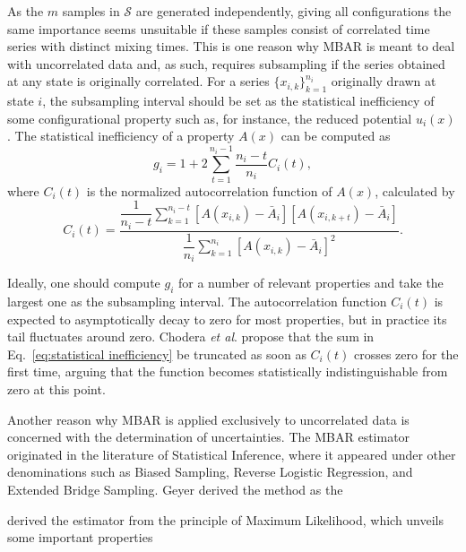 \documentclass[aip,jcp,preprint,amsmath,amssymb]{revtex4-1}
\begin{document}
As the $m$ samples in $\mathcal S$ are generated independently, giving all configurations the same importance seems unsuitable if these samples consist of correlated time series with distinct mixing times. This is one reason why MBAR is meant to deal with uncorrelated data and, as such, requires subsampling if the series obtained at any state is originally correlated.\cite{Shirts_2008} For a series $\{x_{i,k}\}_{k=1}^{n_i}$ originally drawn at state $i$, the subsampling interval should be set as the statistical inefficiency of some configurational property such as, for instance, the reduced potential $u_i(x)$. The statistical inefficiency of a property $A(x)$ can be computed as\cite{Chodera_2007}
\begin{equation}
\label{eq:statistical inefficiency}
g_i = 1 + 2 \sum\limits_{t=1}^{n_i-1} \frac{n_i - t}{n_i} C_i(t),
\end{equation}
where $C_i(t)$ is the normalized autocorrelation function of $A(x)$, calculated by
\begin{equation*}
C_i(t) = \frac{\dfrac{1}{n_i - t} \sum\limits_{k=1}^{n_i-t} [A(x_{i,k}) - \bar A_i][A(x_{i,k+t}) - \bar A_i]}{\dfrac{1}{n_i} \sum\limits_{k=1}^{n_i} [A(x_{i,k}) - \bar A_i]^2}.
\end{equation*}

Ideally, one should compute $g_i$ for a number of relevant properties and take the largest one as the subsampling interval.\cite{Shirts_2008} The autocorrelation function $C_i(t)$ is expected to asymptotically decay to zero for most properties, but in practice its tail fluctuates around zero. Chodera \textit{et al}.\cite{Chodera_2007} propose that the sum in Eq.~\eqref{eq:statistical inefficiency} be truncated as soon as $C_i(t)$ crosses zero for the first time, arguing that the function becomes statistically indistinguishable from zero at this point.

Another reason why MBAR is applied exclusively to uncorrelated data is concerned with the determination of uncertainties. The MBAR estimator originated in the literature of Statistical Inference, where it appeared under other denominations such as Biased Sampling,\cite{Vardi_1985, *Gill_1988} Reverse Logistic Regression,\cite{Geyer_1994} and Extended Bridge Sampling.\cite{Meng_1996, Kong_2003, Tan_2004} Geyer\cite{Geyer_1994} derived the method as the 



derived the estimator from the principle of Maximum Likelihood,\cite{Pawitan_2001, Greene_2012} which unveils some important properties 
\end{document}
